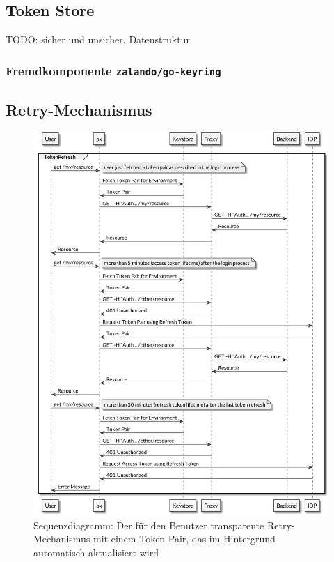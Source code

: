 \subsection{Token Store}
\label{sec:realisierung-token-store}

TODO: sicher und unsicher, Datenstruktur

\subsubsection{Fremdkomponente \texttt{zalando/go-keyring}}

\subsection{Retry-Mechanismus}
\label{sec:retry-mechanism}

\begin{figure}
    \centering
    \includegraphics[width=\linewidth]{pics/sequence-retry.png}
    \caption{Sequenzdiagramm: Der für den Benutzer transparente Retry-Mechanismus mit einem Token Pair, das im Hintergrund automatisch aktualisiert wird}
\end{figure}
